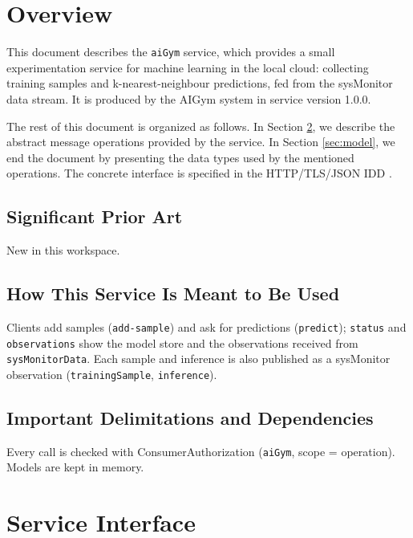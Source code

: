 \documentclass[a4paper]{arrowhead}
\begin{document}
\section{Overview}
\label{sec:overview}

This document describes the \texttt{aiGym} service, which provides a small experimentation service for machine learning in the local cloud: collecting training samples and k-nearest-neighbour predictions, fed from the sysMonitor data stream.
It is produced by the AIGym system \cite{aig-sysd} in service version 1.0.0.

The rest of this document is organized as follows.
In Section \ref{sec:operations}, we describe the abstract message operations provided by the service.
In Section \ref{sec:model}, we end the document by presenting the data types used by the mentioned operations.
The concrete interface is specified in the HTTP/TLS/JSON IDD \cite{aig-aiGym-http-idd}.

\subsection{Significant Prior Art}

New in this workspace.

\subsection{How This Service Is Meant to Be Used}

Clients add samples (\texttt{add-\allowbreak{}sample}) and ask for predictions (\texttt{predict}); \texttt{status} and \texttt{observations} show the model store and the observations received from \texttt{sysMonitorData}. Each sample and inference is also published as a sysMonitor observation (\texttt{trainingSample}, \texttt{inference}).

\subsection{Important Delimitations and Dependencies}
\label{sec:delimitations}

Every call is checked with Consumer\allowbreak{}Authorization (\texttt{aiGym}, scope = operation). Models are kept in memory.

\newpage

\section{Service Interface}
\label{sec:operations}
\end{document}
